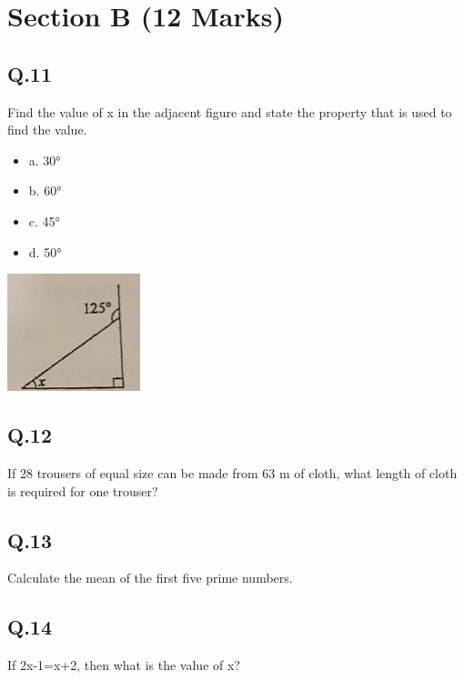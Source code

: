 \documentclass[11pt]{article}
\begin{document}
\section*{Section B (12 Marks)}
\label{sec:org3cfa98d}

\subsection*{Q.11}
\label{sec:orgba16b76}
Find the value of x in the adjacent figure and state the property that is used to find the value.
\begin{itemize}
\item a. 30°
\item b. 60°
\item c. 45°
\item d. 50°
\end{itemize}
\begin{center}
\includegraphics[width=.9\linewidth]{./maths11.png}
\end{center}
\subsection*{Q.12}
\label{sec:org79a2bfd}
If 28 trousers of equal size can be made from 63 m of cloth, what length of cloth is required for one trouser?
\subsection*{Q.13}
\label{sec:orgc395458}
Calculate the mean of the first five prime numbers.
\subsection*{Q.14}
\label{sec:orgca694f4}
If 2x-1=x+2, then what is the value of x?
\end{document}

